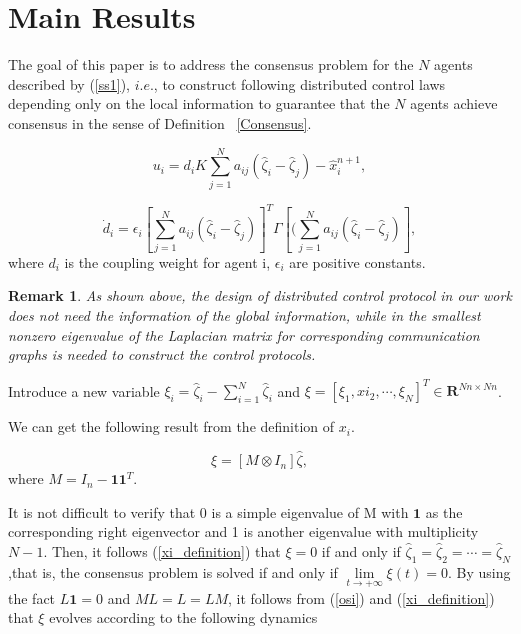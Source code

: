 \documentclass[english]{cccconf}
\newtheorem{remark}{Remark}
\begin{document}
\section{Main Results}

The goal of this paper is to address the consensus problem for the $N$ agents described by (\ref{ss1}), $i.e.$, to construct following distributed control laws depending only on the local information to guarantee that the $N$ agents achieve consensus in the sense of Definition ~\ref{Consensus}.

\begin{equation}
  \label{ui}
  u_i = d_i K \sum_{j=1}^N a_{ij} (\hat \zeta_i - \hat \zeta_j) - \hat x_i^{n+1},
\end{equation}
 
\begin{equation}
  \label{di}
  \dot d_i = \epsilon_i \left[\sum_{j=1}^N a_{ij} (\hat \zeta_i - \hat \zeta_j)\right]^T\Gamma\left[(\sum_{j=1}^N a_{i j} (\hat \zeta_i - \hat \zeta_j)\right],
\end{equation}where $d_i$ is the coupling weight for agent i, $\epsilon_i$ are positive constants.

\begin{remark}
As shown above, the design of distributed control protocol in our work does not need the information of the global information, while in \cite{XiangyuWangTAC2017,DongCCC2017,Qin2014} the smallest nonzero eigenvalue of the Laplacian matrix for corresponding communication graphs is needed to construct the control protocols. 
\end{remark}

Introduce a new variable $\xi_i = \hat \zeta_i - \sum_{i = 1}^N \hat \zeta_i$ and $\xi = [\xi_1, xi_2, \cdots, \xi_N]^T \in \mathbf R^{Nn \times Nn}$.

We can get the following result from the definition of $x_i$.

\begin{equation}\label{xi_definition}
\xi = [M \otimes I_n] \hat \zeta,
\end{equation} where $M=I_n - \mathbf 1 \mathbf 1^T$. 

It is not difficult to verify that 0 is a simple eigenvalue of M with $\mathbf 1$ as the corresponding right eigenvector and 1 is another eigenvalue with multiplicity $N-1$. Then, it follows (\ref{xi_definition}) that $\xi=0$ if and only if $\hat \zeta_1 = \hat \zeta _2 = \cdots = \hat \zeta_N$,that is, the consensus problem is solved if and only if $\mathop{lim}\limits_{t \to +\infty} \xi(t)=0$. By using the fact $L \mathbf 1 = 0$ and $ML = L = LM$, it follows from (\ref{osi}) and (\ref{xi_definition}) that $\xi$ evolves according to the following dynamics
\end{document}

